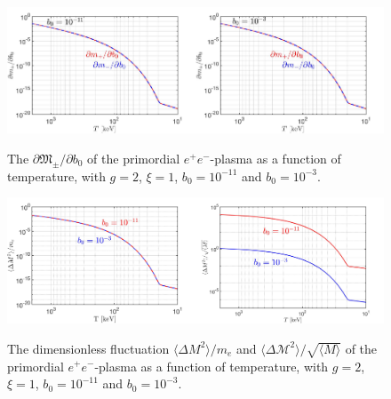 \documentclass[onecolumn,preprintnumbers,amsmath,amssymb]{revtex4}
\begin{document}
 
 \begin{figure}[ht]
 \centering
 \includegraphics[width=0.5\textwidth]{Susceptibility001}\includegraphics[width=0.5\textwidth]{Susceptibility002}
 \caption{The  $\partial{\mathfrak M}_\pm/\partial b_0$ of the primordial $e^{+}e^{-}$-plasma as a function of temperature, with $g=2$,  $\xi=1$, $b_0=10^{-11}$ and $b_0=10^{-3}$.} 
\label{Susc_fig} 
\end{figure}

 \begin{figure}[ht]
 \centering
 \includegraphics[width=0.5\textwidth]{Fluctuation_Magnetization}\includegraphics[width=0.5\textwidth]{Fluctuation_M002}
 \caption{The  dimensionless fluctuation $ \langle\Delta {M}^2\rangle/m_e$  and  $\langle\Delta {\mathcal M}^2\rangle/\sqrt{\langle M\rangle}$ of the primordial $e^{+}e^{-}$-plasma as a function of temperature, with $g=2$,  $\xi=1$, $b_0=10^{-11}$ and $b_0=10^{-3}$.} 
 \label{Flu_fig} 
\end{figure}
 


\begin{thebibliography}{99}
 \end{thebibliography}
\end{document}
